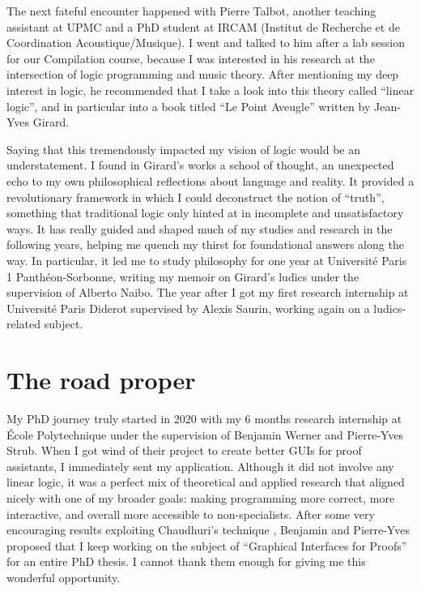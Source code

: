 The next fateful encounter happened with Pierre Talbot, another teaching assistant at UPMC and a PhD student at IRCAM (Institut de Recherche et de Coordination Acoustique/Musique). I went and talked to him after a lab session for our Compilation course, because I was interested in his research at the intersection of logic programming and music theory. After mentioning my deep interest in logic, he recommended that I take a look into this theory called ``linear logic'', and in particular into a book titled ``Le Point Aveugle'' written by Jean-Yves Girard.

Saying that this tremendously impacted my vision of logic would be an understatement. I found in Girard's works a school of thought, an unexpected echo to my own philosophical reflections about language and reality. It provided a revolutionary framework in which I could deconstruct the notion of ``truth'', something that traditional logic only hinted at in incomplete and unsatisfactory ways. It has really guided and shaped much of my studies and research in the following years, helping me quench my thirst for foundational answers along the way. In particular, it led me to study philosophy for one year at Université Paris 1 Panthéon-Sorbonne, writing my memoir on Girard's ludics under the supervision of Alberto Naibo. The year after I got my first research internship at Université Paris Diderot supervised by Alexis Saurin, working again on a ludics-related subject.

\section*{The road proper}

My PhD journey truly started in 2020 with my 6 months research internship at École Polytechnique under the supervision of Benjamin Werner and Pierre-Yves Strub. When I got wind of their project to create better GUIs for proof assistants, I immediately sent my application. Although it did not involve any linear logic, it was a perfect mix of theoretical and applied research that aligned nicely with one of my broader goals: making programming more correct, more interactive, and overall more accessible to non-specialists. After some very encouraging results exploiting Chaudhuri's  technique \cite{Chaudhuri2013}, Benjamin and Pierre-Yves proposed that I keep working on the subject of ``Graphical Interfaces for Proofs'' for an entire PhD thesis. I cannot thank them enough for giving me this wonderful opportunity.

